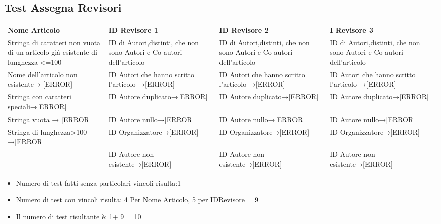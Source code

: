 \subsection{Test Assegna Revisori}
\label{sec:test_assegna_revisori}

\begin{tabular}{|p{3.5cm}|p{3cm}|p{3cm}|p{3cm}|}
\hline
\rowcolor{SkyBlue}
\multicolumn{4}{l}{\textbf{ASSEGNA REVISORE}}\\
\hline
\rowcolor{Red}
\textbf{Nome Articolo} & \textbf{ID Revisore 1} & \textbf{ID Revisore 2} & \textbf{I Revisore 3}  \\
\hline
Stringa di caratteri non vuota di un articolo già esistente di lunghezza <=100 & ID di Autori,distinti, che non sono Autori e Co-autori dell'articolo & ID di Autori,distinti, che non sono Autori e Co-autori dell'articolo & ID di Autori,distinti, che non sono Autori e Co-autori dell'articolo \\
\hline
Nome dell'articolo non esistente→ [ERROR]& ID Autori che hanno scritto l'articolo →[ERROR] & ID Autori che hanno scritto l'articolo →[ERROR] & ID Autori che hanno scritto l'articolo →[ERROR]\\
\hline
Stringa con caratteri speciali→[ERROR]&   ID Autore duplicato→[ERROR] & ID Autore duplicato→[ERROR] & ID Autore duplicato→[ERROR] \\
\hline
Stringa vuota → [ERROR]&ID Autore nullo→[ERROR]& ID Autore nullo→[ERROR & ID Autore nullo→[ERROR \\
\hline
Stringa di lunghezza>100 →[ERROR]&  ID Organizzatore→[ERROR] &  ID Organizzatore→[ERROR] &  ID Organizzatore→[ERROR] \\
\hline
& ID Autore non esistente→[ERROR] & ID Autore non esistente→[ERROR] & ID Autore non esistente→[ERROR] \\
\hline
\end{tabular}

\begin{itemize}
\item Numero di test fatti senza particolari vincoli risulta:1
\item Numero di test con vincoli risulta: 4 Per Nome Articolo, 5 per IDRevisore = 9 
\item  Il numero di test risultante è: 1+ 9 = 10
\end{itemize}
 
